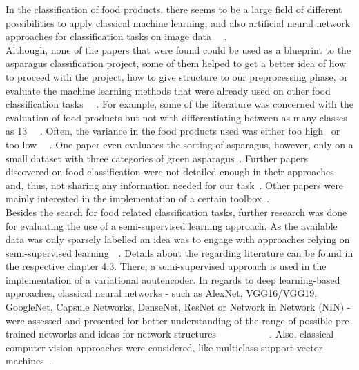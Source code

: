 In the classification of food products, there seems to be a large field of different possibilities to apply classical machine learning, and also artificial neural network approaches for classification tasks on image data~\citep{bhargava2018fruits} ~\citep{brosnan2002inspection}. \\
Although, none of the papers that were found could be used as a blueprint to the asparagus classification project, some of them helped to get a better idea of how to proceed with the project, how to give structure to our preprocessing phase, or evaluate the machine learning methods that were already used on other food classification tasks~\citep{mery2013automated} ~\citep{bhargava2018fruits}. For example, some of the literature was concerned with the evaluation of food products but not with differentiating between as many classes as 13~\citep{diaz2004comparison} ~\citep{kilicc2007classification}. Often, the variance in the food products used was either too high~\citep{zhang2012classification} or too low~\citep{kilicc2007classification} ~\citep{al2011dates}.  One paper even evaluates the sorting of asparagus, however, only on a small dataset with three categories of green asparagus~\citep{donis2016classification}. Further papers discovered on food classification were not detailed enough in their approaches and, thus, not sharing any information needed for our task~\citep{pedreschi2016grading}. Other papers were mainly interested in the implementation of a certain toolbox~\citep{mery2013automated}. \\
Besides the search for food related classification tasks, further research was done for evaluating the use of a semi-supervised learning approach. As the available data was only sparsely labelled an idea was to engage with approaches relying on semi-supervised learning~\citep{olivier2006semi}~\citep{zhu05survey}. Details about the regarding literature can be found in the respective chapter 4.3. There, a semi-supervised approach is used in the implementation of a variational aoutencoder. In regards to deep learning-based approaches, classical neural networks - such as AlexNet, VGG16/VGG19, GoogleNet, Capsule Networks,  DenseNet, ResNet or Network in Network (NIN) - were assessed and presented for better understanding of the range of possible pre-trained networks and ideas for network structures~\citep{alexnet2012original} ~\citep{vgg2014original} ~\citep{googlenet2015original} ~\citep{capsulenet2017original} ~\citep{densenet2017original} ~\citep{resnet2016original} ~\citep{lin2013network}. Also, classical computer vision approaches were considered, like multiclass support-vector-machines~\citep{prakash2012multi}. \\
